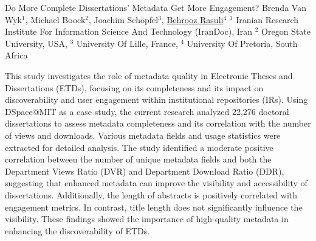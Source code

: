 
   \begin{abstract_online}{Do More Complete Dissertations’ Metadata Get More Engagement?}{%
        Brenda Van Wyk$^{1}$, Michael Boock$^{2}$, Joachim Schöpfel$^{3}$, \underline{Behrooz Rasuli}$^{4}$}{%
        $^1$ Iranian Research Institute For Information Science And Technology (IranDoc), Iran\newline{}%
        $^2$ Oregon State University, USA, $^3$ University Of Lille, France, $^4$ University Of Pretoria, South Africa%
    }%
    
    This study investigates the role of metadata quality in Electronic Theses and Dissertations (ETDs), focusing on its completeness and its impact on discoverability and user engagement within institutional repositories (IRs). Using DSpace@MIT as a case study, the current research analyzed 22,276 doctoral dissertations to assess metadata completeness and its correlation with the number of views and downloads. Various metadata fields and usage statistics were extracted for detailed analysis. The study identified a moderate positive correlation between the number of unique metadata fields and both the Department Views Ratio (DVR) and Department Download Ratio (DDR), suggesting that enhanced metadata can improve the visibility and accessibility of dissertations. Additionally, the length of abstracts is positively correlated with engagement metrics. In contrast, title length does not significantly influence the visibility. These findings showed the importance of high-quality metadata in enhancing the discoverability of ETDs.
\end{abstract_online}

    

